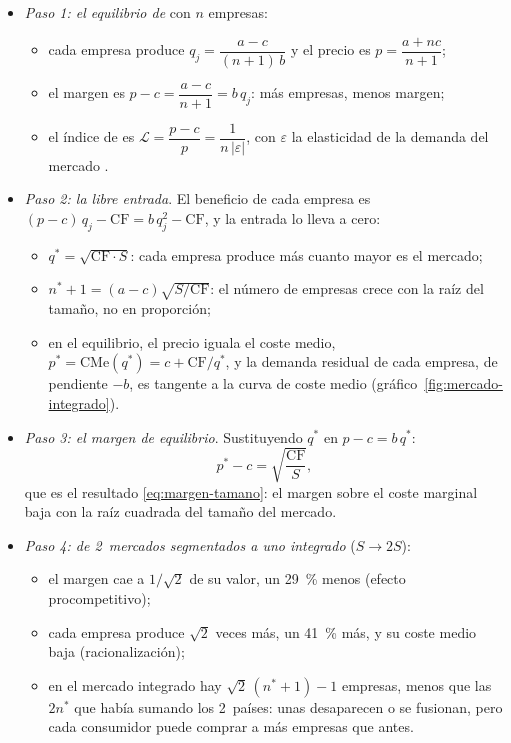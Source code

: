\documentclass[11pt]{article}
\begin{document}
\begin{itemize}
\item \emph{Paso 1: el equilibrio de } con $n$ empresas:
  \begin{itemize}
  \item cada empresa produce $q_j=\dfrac{a-c}{(n+1)\,b}$ y el precio es $p=\dfrac{a+nc}{n+1}$;
  \item el margen es $p-c=\dfrac{a-c}{n+1}=b\,q_j$: más empresas, menos margen;
  \item el índice de  es $\mathcal{L}=\dfrac{p-c}{p}=\dfrac{1}{n\,|\varepsilon|}$, con $\varepsilon$ la elasticidad de la demanda del mercado .
  \end{itemize}
\item \emph{Paso 2: la libre entrada}. El beneficio de cada empresa es $(p-c)\,q_j-\mathrm{CF}=b\,q_j^2-\mathrm{CF}$, y la entrada lo lleva a cero:
  \begin{itemize}
  \item $q^{*}=\sqrt{\mathrm{CF}\cdot S}$: cada empresa produce más cuanto mayor es el mercado;
  \item $n^{*}+1=(a-c)\sqrt{S/\mathrm{CF}}$: el número de empresas crece con la raíz del tamaño, no en proporción;
  \item en el equilibrio, el precio iguala el coste medio, $p^{*}=\mathrm{CMe}(q^{*})=c+\mathrm{CF}/q^{*}$, y la demanda residual de cada empresa, de pendiente $-b$, es tangente a la curva de coste medio (gráfico~\ref{fig:mercado-integrado}).
  \end{itemize}
\item \emph{Paso 3: el margen de equilibrio}. Sustituyendo $q^{*}$ en $p-c=b\,q^{*}$:
  \[
  p^{*}-c=\sqrt{\frac{\mathrm{CF}}{S}},
  \]
  que es el resultado \eqref{eq:margen-tamano}: el margen sobre el coste marginal baja con la raíz cuadrada del tamaño del mercado.
\item \emph{Paso 4: de 2~mercados segmentados a uno integrado} ($S\to2S$):
  \begin{itemize}
  \item el margen cae a $1/\sqrt2$ de su valor, un 29~\% menos (efecto procompetitivo);
  \item cada empresa produce $\sqrt2$ veces más, un 41~\% más, y su coste medio baja (racionalización);
  \item en el mercado integrado hay $\sqrt2\,(n^{*}+1)-1$ empresas, menos que las $2n^{*}$ que había sumando los 2~países: unas desaparecen o se fusionan, pero cada consumidor puede comprar a más empresas que antes.
  \end{itemize}
\end{itemize}
\end{document}
